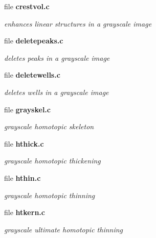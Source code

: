 \begin{DoxyCompactItemize}
\item 
file {\bf crestvol.c}


\begin{DoxyCompactList}\small\item\em enhances linear structures in a grayscale image \item\end{DoxyCompactList}

\item 
file {\bf deletepeaks.c}


\begin{DoxyCompactList}\small\item\em deletes peaks in a grayscale image \item\end{DoxyCompactList}

\item 
file {\bf deletewells.c}


\begin{DoxyCompactList}\small\item\em deletes wells in a grayscale image \item\end{DoxyCompactList}

\item 
file {\bf grayskel.c}


\begin{DoxyCompactList}\small\item\em grayscale homotopic skeleton \item\end{DoxyCompactList}

\item 
file {\bf hthick.c}


\begin{DoxyCompactList}\small\item\em grayscale homotopic thickening \item\end{DoxyCompactList}

\item 
file {\bf hthin.c}


\begin{DoxyCompactList}\small\item\em grayscale homotopic thinning \item\end{DoxyCompactList}

\item 
file {\bf htkern.c}


\begin{DoxyCompactList}\small\item\em grayscale ultimate homotopic thinning \item\end{DoxyCompactList}


\end{DoxyCompactItemize}
